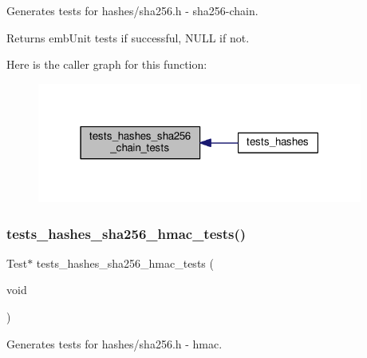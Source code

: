Generates tests for hashes/sha256.\+h -\/ sha256-\/chain. 

\begin{DoxyReturn}{Returns}
emb\+Unit tests if successful, N\+U\+LL if not. 
\end{DoxyReturn}
Here is the caller graph for this function\+:
\nopagebreak
\begin{figure}[H]
\begin{center}
\leavevmode
\includegraphics[width=303pt]{group__unittests_ga31217f1c8fb68025a8a9a17e1a9359b3_icgraph}
\end{center}
\end{figure}
\mbox{\label{group__unittests_ga7a35b0db09ca01c1e2567b95bcd06227}} 
\subsubsection{\texorpdfstring{tests\+\_\+hashes\+\_\+sha256\+\_\+hmac\+\_\+tests()}{tests\_hashes\_sha256\_hmac\_tests()}}
{\footnotesize\ttfamily Test$\ast$ tests\+\_\+hashes\+\_\+sha256\+\_\+hmac\+\_\+tests (\begin{DoxyParamCaption}\item[{void}]{ }\end{DoxyParamCaption})}



Generates tests for hashes/sha256.\+h -\/ hmac. 

